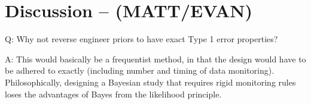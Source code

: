 \documentclass[12pt]{article}
\begin{document}
\section{Discussion -- (MATT/EVAN)}
Q: Why not reverse engineer priors to have exact Type 1 error properties?

A: This would basically be a frequentist method, in that the design would have to be adhered to exactly (including number and timing of data monitoring). Philosophically, designing a Bayesian study that requires rigid monitoring rules loses the advantages of Bayes from the likelihood principle.
%
%
%
%
%				
%
%


%
			
\end{document}
